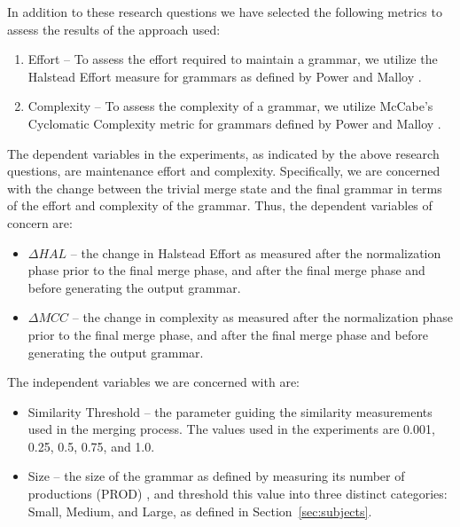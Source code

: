 \documentclass[conference]{IEEEtran}
\providecommand{\tightlist}{%
  \setlength{\itemsep}{0pt}\setlength{\parskip}{0pt}}
\begin{document}
\noindent In addition to these research questions we have selected the
following metrics to assess the results of the approach used:

\begin{enumerate}[label={\textbf{M\arabic*}},left=.2in]

\item Effort -- To assess the effort required to maintain a grammar, we utilize the Halstead Effort measure for grammars as defined by Power and Malloy \cite{powerMetricsSuiteGrammarbased2004}.
  \item Complexity -- To assess the complexity of a grammar, we utilize McCabe's Cyclomatic Complexity metric for grammars defined by Power and Malloy \cite{powerMetricsSuiteGrammarbased2004}.

\end{enumerate}

The dependent variables in the experiments, as indicated by the above
research questions, are maintenance effort and complexity. Specifically,
we are concerned with the change between the trivial merge state and the
final grammar in terms of the effort and complexity of the grammar.
Thus, the dependent variables of concern are:

\begin{itemize}
\tightlist
\item
  \(\Delta HAL\) -- the change in Halstead Effort as measured after the
  normalization phase prior to the final merge phase, and after the
  final merge phase and before generating the output grammar.
\item
  \(\Delta MCC\) -- the change in complexity as measured after the
  normalization phase prior to the final merge phase, and after the
  final merge phase and before generating the output grammar.
\end{itemize}

\noindent The independent variables we are concerned with are:

\begin{itemize}
\tightlist
\item
  Similarity Threshold -- the parameter guiding the similarity
  measurements used in the merging process. The values used in the
  experiments are 0.001, 0.25, 0.5, 0.75, and 1.0.
\item
  Size -- the size of the grammar as defined by measuring its number of
  productions (PROD) \cite{powerMetricsSuiteGrammarbased2004}, and
  threshold this value into three distinct categories: Small, Medium,
  and Large, as defined in Section~\ref{sec:subjects}.
\end{itemize}
\end{document}
